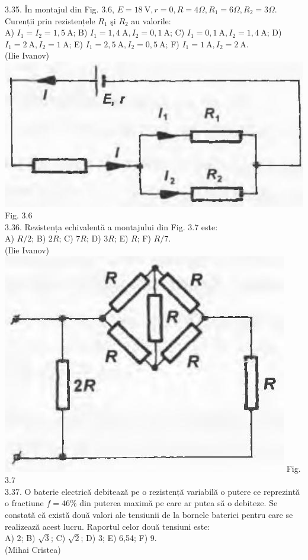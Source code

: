 3.35. În montajul din Fig. 3.6, $E=18 \mathrm{~V}, r=0, R=4 \Omega, R_{1}=6 \Omega, R_{2}=3 \Omega$. Curenții prin rezistențele $R_{1}$ şi $R_{2}$ au valorile:\\ A) $I_{1}=I_{2}=1,5 \mathrm{~A}$; B) $I_{1}=1,4 \mathrm{~A} , I_{2}=0,1 \mathrm{~A}$; C) $I_{1}=0,1 \mathrm{~A} , I_{2}=1,4 \mathrm{~A}$; D) $I_{1}=2 \mathrm{~A} , I_{2}=1 \mathrm{~A}$; E) $I_{1}=2,5 \mathrm{~A} , I_{2}=0,5 \mathrm{~A}$; F) $I_{1}=1 \mathrm{~A} , I_{2}=2 \mathrm{~A}$.\\ (Ilie Ivanov)\\ \includegraphics[width=0.4\linewidth]{images/2025_07_01_5b3ff9fa0d508c8e9f17g-151} Fig. 3.6\\

3.36. Rezistența echivalentă a montajului din Fig. 3.7 este:\\ A) $R / 2$; B) $2 R$; C) $7 R$; D) $3 R$; E) $R$; F) $R / 7$.\\ (Ilie Ivanov)\\ \includegraphics[width=0.4\linewidth]{images/2025_07_01_5b3ff9fa0d508c8e9f17g-151(2)} Fig. 3.7\\

3.37. O baterie electrică debitează pe o rezistență variabilă o putere ce reprezintă o fracțiune $f=46 \%$ din puterea maximă pe care ar putea să o debiteze. Se constată că există două valori ale tensiunii de la bornele bateriei pentru care se realizează acest lucru. Raportul celor două tensiuni este:\\ A) 2; B) $\sqrt{3}$; C) $\sqrt{2}$; D) 3; E) 6,54; F) 9.\\ (Mihai Cristea)\\


